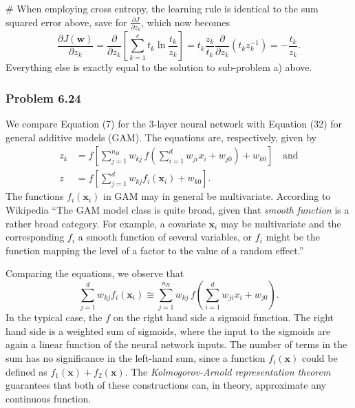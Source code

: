 \documentclass[12pt, a4paper]{article}
\newcommand{\vect}[1]{\bm{#1}}
\begin{document}
{\begin{easylist}[enumerate]
# When employing cross entropy, the learning rule is identical to the sum squared error above, save for $\frac{\partial J}{\partial z_k}$, which now becomes
\begin{equation*}
\frac{\partial J (\vect{w})}{\partial z_k} = \frac{\partial }{\partial z_k} 
\left[
\sum_{k=1}^{c} t_k \ln \frac{t_k}{z_k}
\right]
= 
t_k \frac{z_k}{t_k} \frac{\partial }{\partial z_k}  \left( t_k z_k^{-1} \right)
=
- \frac{t_k}{z_k}.
\end{equation*}
Everything else is exactly equal to the solution to sub-problem a) above.
\end{easylist}



\subsubsection*{Problem 6.24}

We compare Equation (7) for the 3-layer neural network with Equation (32) for general additive models (GAM).
The equations are, respectively, given by
\begin{align*}
	z_k &= f\left[
	\sum_{j=1}^{n_H} w_{kj} \, f \left( \sum_{i=1}^{d} w_{ji} x_i + w_{j0} \right) + w_{k0}
	\right] \quad \text{and}\\
	z &= f\left[
	\sum_{j=1}^{d} w_{kj}  f_i \left( \vect{x}_i \right) + w_{k0}
	\right] .
\end{align*}
The functions $f_i(\vect{x}_i)$ in GAM may in general be multivariate.
According to Wikipedia ``The GAM model class is quite broad, given that \emph{smooth function} is a rather broad category. For example, a covariate $\vect{x}_i$ may be multivariate and the corresponding $f_i$  a smooth function of several variables, or  $f_i$ might be the function mapping the level of a factor to the value of a random effect.''

Comparing the equations, we observe that
\begin{equation*}
	\sum_{j=1}^{d} w_{kj}  f_i \left( \vect{x}_i \right) \cong
	\sum_{j=1}^{n_H} w_{kj} \, f \left( \sum_{i=1}^{d} w_{ji} x_i + w_{j0} \right).
\end{equation*}
In the typical case, the $f$ on the right hand side a sigmoid function.
The right hand side is a weighted sum of sigmoids, where the input to the sigmoids are again a linear function of the neural network inputs.
The number of terms in the sum has no significance in the left-hand sum, since a function $f_i(\vect{x})$ could be defined as $f_1(\vect{x}) + f_2(\vect{x})$.
The \emph{Kolmogorov-Arnold representation theorem} guarantees that both of these constructions can, in theory, approximate any continuous function.



}
\end{document}
